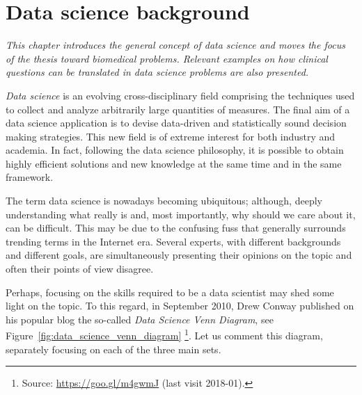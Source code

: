 
\chapter{Data science background} \label{chap:background}

\begin{displayquote}
	\textit{This chapter introduces the general concept of data science and moves the focus of the thesis toward biomedical problems. Relevant examples on how clinical questions can be translated in data science problems are also presented.}
\end{displayquote}

\textit{Data science} is an evolving cross-disciplinary field comprising the techniques used to collect and analyze arbitrarily large quantities of measures. The final aim of a data science application is to devise data-driven and statistically sound decision making strategies.
This new field is of extreme interest for both industry and academia. In fact, following the data science philosophy, it is possible to obtain highly efficient solutions and new knowledge at the same time and in the same framework.

The term data science is nowadays becoming ubiquitous; although, deeply understanding what really is and, most importantly, why should we care about it, can be difficult.
This may be due to the confusing fuss that generally surrounds trending terms in the Internet era. Several experts, with different backgrounds and different goals, are simultaneously presenting their opinions on the topic and often their points of view disagree.

Perhaps, focusing on the skills required to be a data scientist may shed some light on the topic. To this regard, in September 2010, Drew Conway published on his popular blog the so-called \textit{Data Science Venn Diagram}, see Figure~\ref{fig:data_science_venn_diagram} \footnote{ Source: \url{https://goo.gl/m4gwmJ} (last visit 2018-01).}.
Let us comment this diagram, separately focusing on each of the three main sets.

